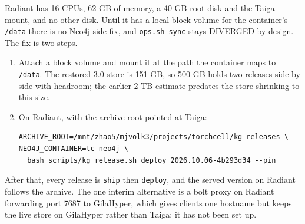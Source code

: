 Radiant has 16 CPUs, 62 GB of memory, a 40 GB root disk and the Taiga mount, and
no other disk. Until it has a local block volume for the container's
\texttt{/data} there is no Neo4j-side fix, and \texttt{ops.sh sync} stays
DIVERGED by design. The fix is two steps.

\begin{enumerate}
\item Attach a block volume and mount it at the path the container maps to
  \texttt{/data}. The restored 3.0 store is 151 GB, so 500 GB holds two releases
  side by side with headroom; the earlier 2 TB estimate predates the store
  shrinking to this size.
\item On Radiant, with the archive root pointed at Taiga:
\begin{verbatim}
ARCHIVE_ROOT=/mnt/zhao5/mjvolk3/projects/torchcell/kg-releases \
NEO4J_CONTAINER=tc-neo4j \
  bash scripts/kg_release.sh deploy 2026.10.06-4b293d34 --pin
\end{verbatim}
\end{enumerate}

After that, every release is \texttt{ship} then \texttt{deploy}, and the served
version on Radiant follows the archive. The one interim alternative is a bolt
proxy on Radiant forwarding port 7687 to GilaHyper, which gives clients one
hostname but keeps the live store on GilaHyper rather than Taiga; it has not been
set up.
